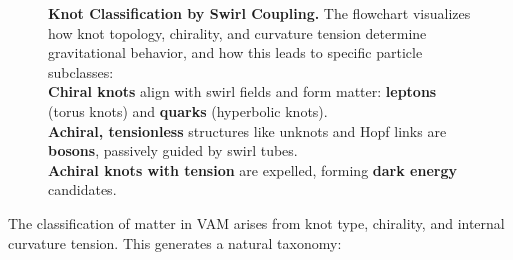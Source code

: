\documentclass[preprint]{revtex4-2}
\begin{document}
\begin{figure}[H]
{
            }
            \caption{\footnotesize
            \textbf{Knot Classification by Swirl Coupling.}
                The flowchart visualizes how knot topology, chirality, and curvature tension determine gravitational behavior, and how this leads to specific particle subclasses:
                    \\ \textbf{Chiral knots} align with swirl fields and form matter: \textbf{leptons} (torus knots) and \textbf{quarks} (hyperbolic knots).
                    \\ \textbf{Achiral, tensionless} structures like unknots and Hopf links are \textbf{bosons}, passively guided by swirl tubes.
                    \\ \textbf{Achiral knots with tension} are expelled, forming \textbf{dark energy} candidates.
            }\label{fig:knot-classification}
        \end{figure}

    The classification of matter in VAM arises from knot type, chirality, and internal curvature tension. This generates a natural taxonomy:
\end{document}
